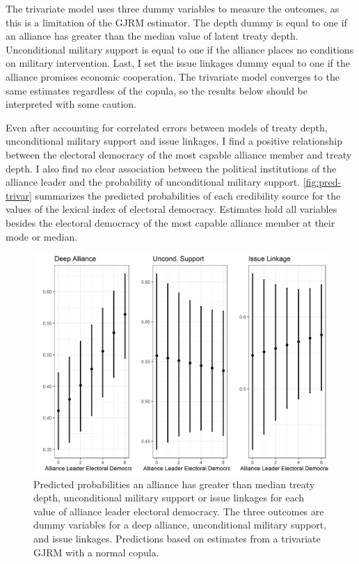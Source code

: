\documentclass[12pt]{article}
\begin{document}
The trivariate model uses three dummy variables to measure the outcomes, as this is a limitation of the GJRM estimator. 
The depth dummy is equal to one if an alliance has greater than the median value of latent treaty depth. 
Unconditional military support is equal to one if the alliance places no conditions on military intervention. 
Last, I set the issue linkages dummy equal to one if the alliance promises economic cooperation. 
The trivariate model converges to the same estimates regardless of the copula, so the results below should be interpreted with some caution.


Even after accounting for correlated errors between models of treaty depth, unconditional military support and issue linkages, I find a positive relationship between the electoral democracy of the most capable alliance member and treaty depth. 
I also find no clear association between the political institutions of the alliance leader and the probability of unconditional military support. 
\autoref{fig:pred-trivar} summarizes the predicted probabilities of each credibility source for the values of the lexical index of electoral democracy. 
Estimates hold all variables besides the electoral democracy of the most capable alliance member at their mode or median.  


\begin{figure}
\includegraphics[width=.95\textwidth]{pred-trivar.png}  
\caption{Predicted probabilities an alliance has greater than median treaty depth, unconditional military support or issue linkages for each value of alliance leader electoral democracy. The three outcomes are dummy variables for a deep alliance, unconditional military support, and issue linkages. Predictions based on estimates from a trivariate GJRM with a normal copula.}
\label{fig:pred-trivar}
\end{figure}




\newpage

\singlespace
 
 
\end{document}
